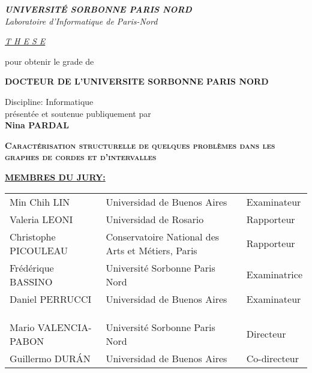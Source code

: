 \documentclass[12pt]{book}
\author{Lic. Nina Pardal}
\theoremstyle{plain}
\theoremstyle{remark}
\begin{document}
\thispagestyle{empty}


\begin {center}

\medskip
\textit{\textbf{UNIVERSITÉ SORBONNE PARIS NORD} } \\

\textit{ Laboratoire d'Informatique de Paris-Nord}

\vspace{2cm}

\underline{\textit{T H E S E}} \\

\vspace{.7cm}

pour obtenir le grade de \\

\vspace{.5cm}

\textbf{DOCTEUR DE L'UNIVERSITE SORBONNE PARIS NORD }\\

\vspace{1cm}

Discipline: Informatique \\

\vspace{.5cm}
présentée et soutenue publiquement par \\

\vspace{.5cm}
\textbf{Nina PARDAL} \\

\vspace{1cm}

\textsc{\textbf{\Large Caractérisation structurelle de quelques problèmes dans les graphes de cordes et d'intervalles}} %


\vspace{1.5cm}

\underline{\textbf{MEMBRES DU JURY:}}
\vspace{.5cm}

\end{center}


\small{
\hskip-1cm \begin{tabular}{lll}
Min Chih LIN & Universidad de Buenos Aires & Examinateur \\
Valeria LEONI & Universidad de Rosario & Rapporteur \\
Christophe PICOULEAU & Conservatoire National des Arts et Métiers, Paris & Rapporteur \\ 
Frédérique BASSINO & Université Sorbonne Paris Nord & Examinatrice \\
Daniel PERRUCCI & Universidad de Buenos Aires & Examinateur \\
\\
\\
\\
Mario VALENCIA-PABON & Université Sorbonne Paris Nord & Directeur \\ 
Guillermo DURÁN & Universidad de Buenos Aires & Co-directeur
\end{tabular}
}
\end{document}
